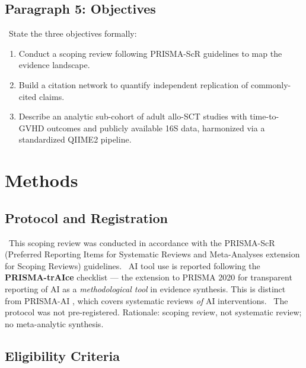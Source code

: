 \documentclass[11pt,a4paper]{article}
\newcommand{\todoitem}[1]{\textcolor{blue!70!black}{\textbullet~#1}}
\begin{document}
\subsection*{Paragraph 5: Objectives}
\todoitem{State the three objectives formally:}
\begin{enumerate}[label=(\arabic*)]
    \item Conduct a scoping review following PRISMA-ScR guidelines to map the evidence landscape.
    \item Build a citation network to quantify independent replication of commonly-cited claims.
    \item Describe an analytic sub-cohort of adult allo-SCT studies with time-to-GVHD outcomes and publicly available 16S data, harmonized via a standardized QIIME2 pipeline.
\end{enumerate}


\section{Methods}
\label{sec:methods}

\subsection{Protocol and Registration}
\label{sec:protocol}
\todoitem{This scoping review was conducted in accordance with the PRISMA-ScR (Preferred Reporting Items for Systematic Reviews and Meta-Analyses extension for Scoping Reviews) guidelines.}
\todoitem{AI tool use is reported following the \textbf{PRISMA-trAIce} checklist \cite{PRISMAtrAIce2025} --- the extension to PRISMA 2020 for transparent reporting of AI as a \emph{methodological tool} in evidence synthesis. This is distinct from PRISMA-AI \cite{PRISMAAI2023}, which covers systematic reviews \emph{of} AI interventions.}
\todoitem{The protocol was not pre-registered. Rationale: scoping review, not systematic review; no meta-analytic synthesis.}

\subsection{Eligibility Criteria}
\label{sec:eligibility}
\end{document}
